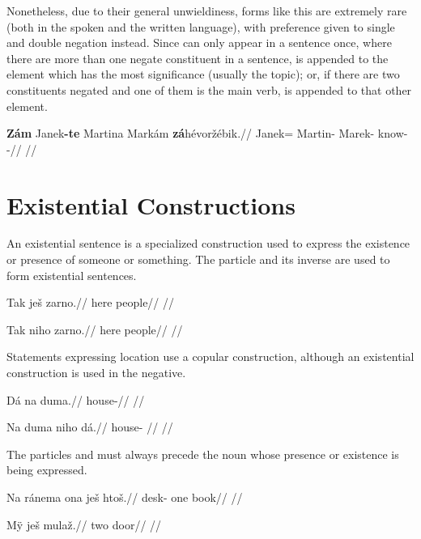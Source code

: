 Nonetheless, due to their general unwieldiness, forms like this are extremely
rare (both in the spoken and the written language), with preference given to
single and double negation instead. Since  can only appear in a
sentence once, where there are more than one negate constituent in a sentence,
 is appended to the element which has the most significance (usually
the topic); or, if there are two constituents negated and one of them is the
main verb,  is appended to that other element.

\pex
\begingl
    \gla \textbf{Zám} Janek\textbf{-te} Martina Markám \textbf{zá}hévoržébik.//
    \glb \Neg{} Janek=\Foc{} Martin-\Pat{} Marek-\Agt{} \Neg{}know-\Ben{}-\Pf{}//
    \glft {}//
\endgl
\xe


\section{Existential Constructions}
\label{sec:exst}
An existential sentence is a specialized construction used to express the existence or presence of someone or something. The particle  and its inverse  are used to form existential sentences.

\pex
\begingl
\gla Tak ješ zarno.//
\glb here \Exst{} people//
\glft {}//
\endgl
\xe

\pex
\begingl
\gla Tak niho zarno.//
\glb here  people//
\glft {}//
\endgl
\xe

Statements expressing location use a copular construction, although an existential construction is used in the negative.

\pex
\begingl
\gla Dá na duma.//
\glb {} \Loc{} house-\Pat{}//
\glft {}//
\endgl
\xe

\pex
\begingl
\gla Na duma niho dá.//
\glb \Loc{} house-\Pat{}  //
\glft {}//
\endgl
\xe

The particles  and  must always precede the noun whose presence or existence is being expressed.

\pex
\begingl
\gla Na ránema ona ješ htoš.//
\glb \Loc{} desk- one \Exst{} book//
\glft {}//
\endgl
\xe

\pex
\begingl
\gla M\"y ješ mulaž.//
\glb two \Exst{} door//
\glft {}//
\endgl
\xe



